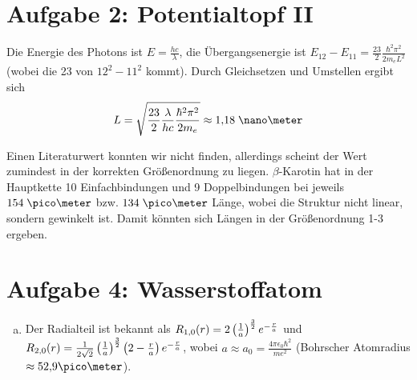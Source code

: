 \documentclass[a4paper,german,12pt,smallheadings]{scrartcl}
\begin{document}
\section*{Aufgabe 2: Potentialtopf II}

Die Energie des Photons ist $E = \frac{hc}{\lambda}$, die Übergangsenergie ist
$E_{12} - E_{11} = \frac{23}{2} \frac{\hbar^2 \pi^2}{2 m_e L^2}$ (wobei die 23
von $12^2 - 11^2$ kommt). Durch Gleichsetzen und Umstellen ergibt sich
\begin{align}
  L = \sqrt{\frac{23}{2} \frac{\lambda}{hc} \frac{\hbar^2 \pi^2}{2 m_e}} \approx 1{,}18 \; \nano\meter
\end{align}

Einen Literaturwert konnten wir nicht finden, allerdings scheint der Wert
zumindest in der korrekten Größenordnung zu liegen. $\beta$-Karotin hat in der
Hauptkette 10 Einfachbindungen und 9 Doppelbindungen bei jeweils $154 \;
\pico\meter$ bzw. $134 \; \pico\meter$ Länge, wobei die Struktur nicht linear,
sondern gewinkelt ist. Damit könnten sich Längen in der Größenordnung 1-3
\nano\meter \;ergeben.

\section*{Aufgabe 4: Wasserstoffatom}
\begin{enumerate}[a)]
  \item
    Der Radialteil ist bekannt als $R_{1,0}(r) = 2 \del{
    \frac{1}{a}}^\frac{3}{2} e^{-\frac{r}{a}}$ und $R_{2,0}(r) = \frac{1}{2\sqrt{2}} \del{
    \frac{1}{a}}^\frac{3}{2} \del{2 - \frac{r}{a}} e^{-\frac{r}{a}}$, wobei $a
    \approx a_0 = \frac{4 \pi \epsilon_0 \hbar^2}{m e^2}$ (Bohrscher
    Atomradius $\approx 52{,}9 \pico\meter$).

\end{enumerate}
\end{document}
